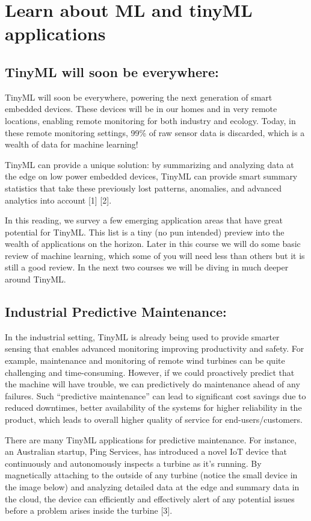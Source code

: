 \section{Learn about ML and tinyML applications}

\subsection{TinyML will soon be everywhere:}

TinyML will soon be everywhere, powering the next generation of smart embedded devices. These devices will be in our homes and in very remote locations, enabling remote monitoring for both industry and ecology. Today, in these remote monitoring settings, 99\% of raw sensor data is discarded, which is a wealth of data for machine learning! 

TinyML can provide a unique solution: by summarizing and analyzing data at the edge on low power embedded devices, TinyML can provide smart summary statistics that take these previously lost patterns, anomalies, and advanced analytics into account [1] [2].

In this reading, we survey a few emerging application areas that have great potential for TinyML. This list is a tiny (no pun intended) preview into the wealth of applications on the horizon. Later in this course we will do some basic review of machine learning, which some of you will need less than others but it is still a good review. In the next two courses we will be diving in much deeper around TinyML.

\subsection{Industrial Predictive Maintenance:}

In the industrial setting, TinyML is already being used to provide smarter sensing that enables advanced monitoring improving productivity and safety. For example, maintenance and monitoring of remote wind turbines can be quite challenging and time-consuming. However, if we could proactively predict that the machine will have trouble, we can predictively do maintenance ahead of any failures. Such “predictive maintenance” can lead to significant cost savings due to reduced downtimes, better availability of the systems for higher reliability in the product, which leads to overall higher quality of service for end-users/customers.

There are many TinyML applications for predictive maintenance. For instance, an Australian startup, Ping Services, has introduced a novel IoT device that continuously and autonomously inspects a turbine as it’s running. By magnetically attaching to the outside of any turbine (notice the small device in the image below) and analyzing detailed data at the edge and summary data in the cloud, the device can efficiently and effectively alert of any potential issues before a problem arises inside the turbine [3].

